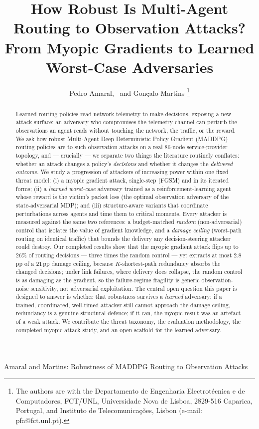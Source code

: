 \documentclass[10pt,journal,comsoc]{IEEEtran}
\begin{document}
\title{How Robust Is Multi-Agent Routing to Observation Attacks?\\
From Myopic Gradients to Learned Worst-Case Adversaries}

\author{Pedro Amaral,~ and Gon\c{c}alo Martins%
\thanks{The authors are with the Departamento de Engenharia Electrot\'ecnica e de Computadores, FCT/UNL, Universidade Nova de Lisboa, 2829-516 Caparica, Portugal, and Instituto de Telecomunica\c{c}\~oes, Lisbon (e-mail: pfa@fct.unl.pt).}}

%
{Amaral and Martins: Robustness of MADDPG Routing to Observation Attacks}
\maketitle

\begin{abstract}
Learned routing policies read network telemetry to make decisions, exposing a new
attack surface: an adversary who compromises the telemetry channel can perturb the
observations an agent reads without touching the network, the traffic, or the reward.
We ask how robust Multi-Agent Deep Deterministic Policy Gradient (MADDPG) routing
policies are to such observation attacks on a real 86-node service-provider topology,
and --- crucially --- we separate two things the literature routinely conflates:
whether an attack changes a policy's \emph{decisions} and whether it changes the
\emph{delivered outcome}. We study a progression of attackers of increasing power
within one fixed threat model: (i) a myopic gradient attack, single-step (FGSM) and
in its iterated forms; (ii) a \emph{learned worst-case} adversary trained as a
reinforcement-learning agent whose reward is the victim's packet loss (the optimal
observation adversary of the state-adversarial MDP); and (iii) structure-aware
variants that coordinate perturbations across agents and time them to critical
moments. Every attacker is measured against the same two references: a budget-matched
\emph{random} (non-adversarial) control that isolates the value of gradient
knowledge, and a \emph{damage ceiling} (worst-path routing on identical traffic) that
bounds the delivery any decision-steering attacker could destroy. Our completed
results show that the myopic gradient attack flips up to $26\%$ of routing decisions
--- three times the random control --- yet extracts at most $2.8$\,pp of a $21$\,pp
damage ceiling, because $K$-shortest-path redundancy absorbs the changed decisions;
under link failures, where delivery does collapse, the random control is as damaging
as the gradient, so the failure-regime fragility is generic observation-noise
sensitivity, not adversarial exploitation. The central open question this paper is
designed to answer is whether that robustness survives a \emph{learned} adversary:
if a trained, coordinated, well-timed attacker still cannot approach the damage
ceiling, redundancy is a genuine structural defence; if it can, the myopic result was
an artefact of a weak attack. We contribute the threat taxonomy, the evaluation
methodology, the completed myopic-attack study, and an open scaffold for the learned
adversary.
\end{abstract}
\end{document}
